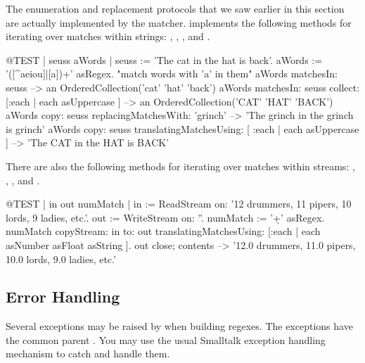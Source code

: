 \documentclass[a4paper,10pt,twoside]{book}
\begin{document}
{The  enumeration and replacement protocols that we saw earlier in this section are actually implemented by the matcher.
 implements the following methods for iterating over matches within strings:
,
,
,
 and
.

\begin{code}{@TEST | seuss aWords |}
seuss := 'The cat in the hat is back'.
aWords := '\<([^aeiou]|[a])+\>' asRegex.    "match words with 'a' in them"
aWords matchesIn: seuss
    --> an OrderedCollection('cat' 'hat' 'back')
aWords matchesIn: seuss collect: [:each | each asUppercase ]
    --> an OrderedCollection('CAT' 'HAT' 'BACK')
aWords copy: seuss replacingMatchesWith: 'grinch'
    --> 'The grinch in the grinch is grinch'
aWords copy: seuss translatingMatchesUsing: [ :each | each asUppercase ]
    --> 'The CAT in the HAT is BACK'
\end{code}

There are also the following methods for iterating over matches within streams:
,
,
,
 and
.

\begin{code}{@TEST | in out numMatch |}
in := ReadStream on: '12 drummers, 11 pipers, 10 lords, 9 ladies, etc.'.
out := WriteStream on: ''.
numMatch := '\<\d+\>' asRegex.
numMatch
  copyStream: in
  to: out
  translatingMatchesUsing: [:each | each asNumber asFloat asString ].
out close; contents --> '12.0 drummers, 11.0 pipers, 10.0 lords, 9.0 ladies, etc.'
\end{code}


\subsection{Error Handling}

Several exceptions may be raised by  when building regexes.  The exceptions have the common parent .  You may use the usual Smalltalk exception handling mechanism to catch and handle them.

}
\end{document}
